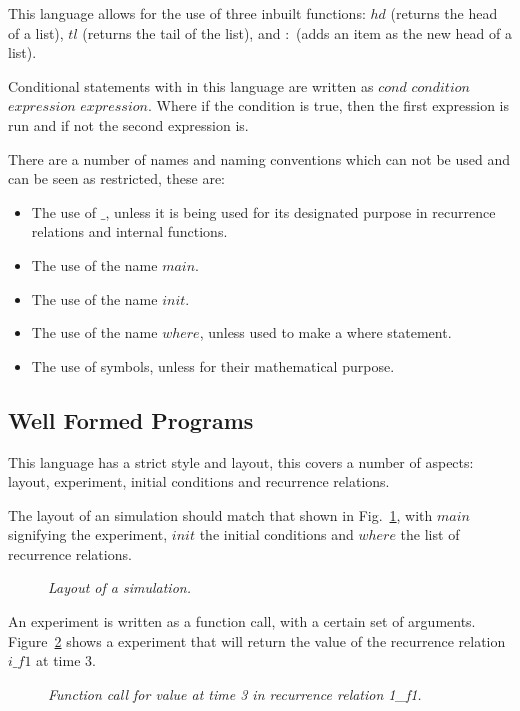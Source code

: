 \documentclass{article}
\begin{document}
This language allows for the use of three inbuilt functions: $hd$ (returns the head of a list), $tl$ (returns the tail of the list), and $:$ (adds an item as the new head of a list).  

Conditional statements with in this language are written as $cond$ $condition$ $expression$ $expression$. Where if the condition is true, then the first expression is run and if not the second expression is.  

There are a number of names and naming conventions which can not be used and can be seen as restricted, these are:
\begin{itemize}
  \item The use of $\_$, unless it is being used for its designated purpose in recurrence relations and internal functions. 
  \item The use of the name $main$.
  \item The use of the name $init$.
  \item The use of the name $where$, unless used to make a where statement.
  \item The use of symbols, unless for their mathematical purpose.  
\end{itemize}






\subsection{Well Formed Programs} \label{wellformedprogs} 
This language has a strict style and layout, this covers a number of aspects: layout, experiment, initial conditions and recurrence relations.  

The layout of an simulation should match that shown in Fig.~\ref{fig:1exofla}, with $main$ signifying the experiment, $init$ the initial conditions and $where$ the list of recurrence relations. 
\begin{figure}[H]
	\centering
	
	\caption{\it Layout of a simulation.}
	\label{fig:1exofla}
\end{figure} 

An experiment is written as a function call, with a certain set of arguments. Figure~\ref{fig:2exofla} shows a experiment that will return the value of the recurrence relation $i\_f1$ at time $3$.
\begin{figure}[H]
	\centering
	
	\caption{\it Function call for value at time 3 in recurrence relation 1\_f1.}
	\label{fig:2exofla}
\end{figure} 
 
\end{document}
